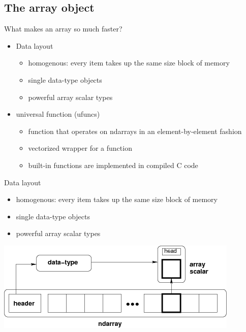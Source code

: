 \subsection{The array object}

\begin{frame}
  What makes an array so much faster?
  \begin{itemize}
  \item Data layout
    \begin{itemize}
    \item homogenous: every item takes up the same size block of memory
    \item single data-type objects
    \item powerful array scalar types
    \end{itemize}
  \item universal function (ufuncs)
    \begin{itemize}
    \item function that operates on ndarrays in an element-by-element fashion
    \item vectorized wrapper for a function
    \item built-in functions are implemented in compiled C code
    \end{itemize}
\end{itemize}
\end{frame}

\begin{frame}
  Data layout
  \begin{itemize}
  \item homogenous: every item takes up the same size block of memory
  \item single data-type objects
  \item powerful array scalar types
  \end{itemize}
  \begin{center}
    \includegraphics[scale=.5]{../figures/numpy/threefundamental.png}
  \end{center}
\end{frame}

